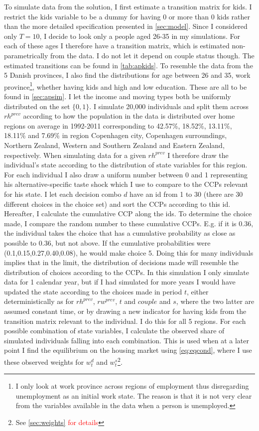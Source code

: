 To simulate data from the solution, I first estimate a transition matrix for kids. I restrict the kids variable to be a dummy for having 0 or more than 0 kids rather than the more detailed specification presented in \autoref{sec:model}. Since I considered only $T=10$, I decide to look only a people aged 26-35 in my simulations. For each of these ages I therefore have a transition matrix, which is estimated non-parametrically from the data. I do not let it depend on couple status though. The estimated transitions can be found in \autoref{tab:apkids}. To resemble the data from the 5 Danish provinces, I also find the distributions for age between 26 and 35, work province\footnote{I only look at work province across regions of employment thus disregarding unemployment as an initial work state. The reason is that it is not very clear from the variables available in the data when a person is unemployed.}, whether having kids and high and low education. These are all to be found in \autoref{sec:apsim}. I let the income and moving types both be uniformly distributed on the set $\{0,1\}$. I simulate 20,000 individuals and split them across $rh^{prev}$ according to how the population in the data is distributed over home regions on average in 1992-2011 corresponding to 42.57\%, 18.52\%, 13.11\%, 18.11\% and 7.69\% in region Copenhagen city, Copenhagen surroundings, Northern Zealand, Western and Southern Zealand and Eastern Zealand, respectively. When simulating data for a given $rh^{prev}$ I therefore draw the individual's state according to the distribution of state variables for this region. For each individual I also draw a uniform number between 0 and 1 representing his alternative-specific taste shock which I use to compare to the CCPs relevant for his state. I let each decision combo $d$ have an id from 1 to 30 (there are 30 different choices in the choice set) and sort the CCPs according to this id. Hereafter, I calculate the cumulative CCP along the ids. To determine the choice made, I compare the random number to these cumulative CCPs. E.g. if it is 0.36, the individual takes the choice that has a cumulative probability as close as possible to 0.36, but not above. If the cumulative probabilities were (0.1,0.15,0.27,0.40,0.08), he would make choice 5. Doing this for many individuals implies that in the limit, the distribution of decisions made will resemble the distribution of choices according to the CCPs. In this simulation I only simulate data for 1 calendar year, but if I had simulated for more years I would have updated the state according to the choices made in period $t$, either deterministically as for $rh^{prev}$, $rw^{prev}$, $t$ and $couple$ and $s$, where the two latter are assumed constant time, or by drawing a new indicator for having kids from the transition matrix relevant to the individual. I do this for all 5 regions. For each possible combination of state variables, I calculate the observed share of simulated individuals falling into each combination. This is used when at a later point I find the equilibrium on the housing market using \autoref{eq:eqcond}, where I use these observed weights for $w_t^d$ and $w_t^s$\footnote{See \textcolor{red}{\autoref{sec:weights} for details}}. 

